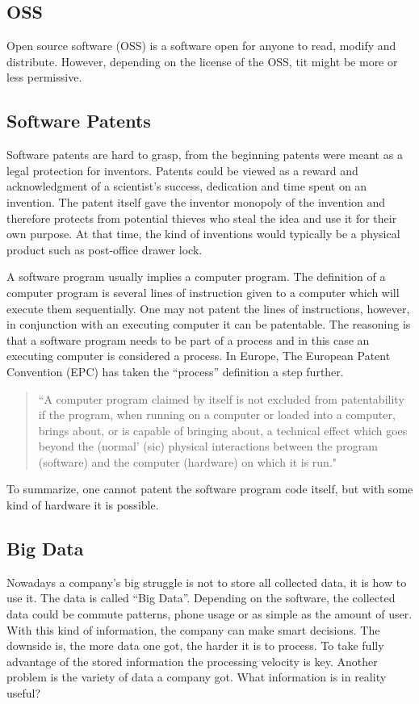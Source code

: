 \documentclass[conference]{IEEEtran}
\begin{document}
\subsection{OSS}
Open source software (OSS) is a software open for anyone to read, modify and distribute. However, depending on the license of the OSS, tit might be more or less permissive. \cite{OSS}

\subsection{Software Patents}
Software patents are hard to grasp, from the beginning patents were meant as a legal protection for inventors. Patents could be viewed as a reward and acknowledgment of a scientist's success, dedication and time spent on an invention. The patent itself gave the inventor monopoly of the invention and therefore protects from potential thieves who steal the idea and use it for their own purpose. \cite{SoftwarePatent} At that time, the kind of inventions would typically be a physical product such as post-office drawer lock. \cite{LockPatent}

A software program usually implies a computer program. The definition of a computer program is several lines of instruction given to a computer which will execute them sequentially. One may not patent the lines of instructions, however, in conjunction with an executing computer it can be patentable. The reasoning is that a software program needs to be part of a process and in this case an executing computer is considered a process. In Europe, The European Patent Convention (EPC) has taken the ``process'' definition a step further. \cite{SoftwarePatent}
\begin{quotation}
``A computer program claimed by itself is not excluded from patentability if the program, when running on a computer or loaded into a computer, brings about, or is capable of bringing about, a technical effect which goes beyond the (normal' (sic) physical interactions between the program (software) and the computer (hardware) on which it is run." \cite[p. 36]{SoftwarePatent}
\end{quotation} 

To summarize, one cannot patent the software program code itself, but with some kind of hardware it is possible.
\subsection{Big Data}
Nowadays a company's big struggle is not to store all collected data, it is how to use it. The data is called ``Big Data''. \cite{ExploitBigData} Depending on the software, the collected data could be commute patterns, phone usage or as simple as the amount of user. With this kind of information, the company can make smart decisions. The downside is, the more data one got, the harder it is to process. To take fully advantage of the stored information the processing velocity is key. Another problem is the variety of data a company got. What information is in reality useful? \cite{SpeedDataEco} 
\end{document}
